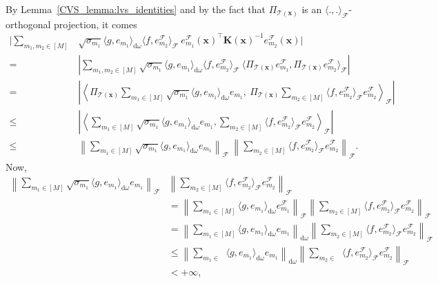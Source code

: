 \documentclass[twoside,11pt]{book}
\numberwithin{theorem}{chapter}
\numberwithin{definition}{chapter}
\numberwithin{proposition}{chapter}
\numberwithin{corollary}{chapter}
\numberwithin{example}{chapter}
\numberwithin{lemma}{chapter}
\numberwithin{assumption}{chapter}
\DeclareMathOperator{\Tran}{\intercal}
\DeclareMathOperator{\F}{\mathcal{F}}
\DeclareMathOperator{\Ns}{\mathbb{N}^{*}}
\begin{document}
By Lemma~\ref{CVS_lemma:lvs_identities} and by the fact that $\Pi_{\mathcal{T}(\bm{x})}$ is an $\langle.,.\rangle_{\F}$-orthogonal projection, it comes
\begin{align}
\Bigg|\sum_{m_{1}, m_2 \in [M]} &\sqrt{\sigma_{m_{1}}} \langle g, e_{m_{1}} \rangle_{\mathrm{d}\omega} \langle f, e_{m_{2}}^{\F} \rangle_{\F}  \: e_{m_{1}}^{\F}(\bm{x})^{\Tran} \bm{K}(\bm{x})^{-1}e_{m_{2}}^{\F}(\bm{x}) \Bigg| \\
= & \left|\sum_{m_{1}, m_2 \in [M]} \sqrt{\sigma_{m_{1}}} \langle g, e_{m_{1}} \rangle_{\mathrm{d}\omega}  \langle f, e_{m_{2}}^{\F} \rangle_{\F}  \: \langle \Pi_{\mathcal{T}(\bm{x})}e_{m_{1}}^{\F}, \Pi_{\mathcal{T}(\bm{x})}e_{m_{2}}^{\F} \rangle_{\F} \right|\\
= & \left| \left\langle \Pi_{\mathcal{T}(\bm{x})} \sum\limits_{m_{1} \in [M] }  \sqrt{\sigma_{m_{1}}} \langle g, e_{m_{1}} \rangle_{\mathrm{d}\omega}   e_{m_{1}},\:  \Pi_{\mathcal{T}(\bm{x})} \sum\limits_{m_{2} \in [M]} \langle f, e_{m_{2}}^{\F} \rangle_{\F} e_{m_{2}}^{\F} \right\rangle_{\F} \right|\\
\leq & \left| \left\langle \sum\limits_{m_{1} \in [M] }  \sqrt{\sigma_{m_{1}}} \langle g, e_{m_{1}} \rangle_{\mathrm{d}\omega}   e_{m_{1}},  \sum\limits_{m_{2} \in [M]} \langle f, e_{m_{2}}^{\F} \rangle_{\F} e_{m_{2}}^{\F} \right\rangle_{\F} \right|\\
\leq & \left\| \sum\limits_{m_{1} \in [M] }  \sqrt{\sigma_{m_{1}}} \langle g, e_{m_{1}} \rangle_{\mathrm{d}\omega}   e_{m_{1}} \right\|_{\F}\: \left \| \sum\limits_{m_{2} \in [M]} \langle f, e_{m_{2}}^{\F} \rangle_{\F} e_{m_{2}}^{\F} \right\|_{\F}.
\end{align}
Now,
\begin{align}
\left\| \sum\limits_{m_{1} \in [M] }  \sqrt{\sigma_{m_{1}}} \langle g, e_{m_{1}} \rangle_{\mathrm{d}\omega}   e_{m_{1}} \right\|_{\F}  & \left \| \sum\limits_{m_{2} \in [M]} \langle f, e_{m_{2}}^{\F} \rangle_{\F} e_{m_{2}}^{\F} \right\|_{\F}\\
&  = \left\| \sum\limits_{m_{1} \in [M] }  \langle g, e_{m_{1}} \rangle_{\mathrm{d}\omega}   e_{m_{1}}^{\F} \right\|_{\F} \left \| \sum\limits_{m_{2} \in [M]} \langle f, e_{m_{2}}^{\F} \rangle_{\F} e_{m_{2}}^{\F} \right\|_{\F}\\
&  = \left\| \sum\limits_{m_{1} \in [M] }  \langle g, e_{m_{1}} \rangle_{\mathrm{d}\omega}   e_{m_{1}} \right\|_{\mathrm{d}\omega} \left \| \sum\limits_{m_{2} \in [M]} \langle f, e_{m_{2}}^{\F} \rangle_{\F} e_{m_{2}}^{\F} \right\|_{\F}\\
&  \leq \left\| \sum\limits_{m_{1} \in \Ns }  \langle g, e_{m_{1}} \rangle_{\mathrm{d}\omega}   e_{m_{1}} \right\|_{\mathrm{d}\omega} \left \| \sum\limits_{m_{2} \in \Ns} \langle f, e_{m_{2}}^{\F} \rangle_{\F} e_{m_{2}}^{\F} \right\|_{\F}\\
& < +\infty,
\end{align}
\end{document}
